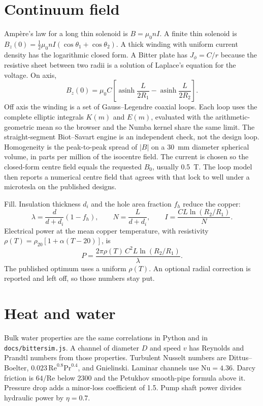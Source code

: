 \documentclass[11pt]{article}
\begin{document}
\section{Continuum field}

Amp\`ere's law for a long thin solenoid is $B=\mu_0 n I$.
A finite thin solenoid is $B_z(0)=\frac12\mu_0 n I(\cos\theta_1+\cos\theta_2)$.
A thick winding with uniform current density has the logarithmic closed form.
A Bitter plate has $J_\phi = C/r$ because the resistive sheet between two radii is a solution of Laplace's equation for the voltage.
On axis,
\begin{equation}
B_z(0)=\mu_0 C\left[\operatorname{asinh}\frac{L}{2R_1}-\operatorname{asinh}\frac{L}{2R_2}\right].
\end{equation}
Off axis the winding is a set of Gauss--Legendre coaxial loops.
Each loop uses the complete elliptic integrals $K(m)$ and $E(m)$, evaluated with the arithmetic-geometric mean so the browser and the Numba kernel share the same limit.
The straight-segment Biot--Savart engine is an independent check, not the design loop.
Homogeneity is the peak-to-peak spread of $|B|$ on a 30~mm diameter spherical volume, in parts per million of the isocentre field.
The current is chosen so the closed-form centre field equals the requested $B_0$, usually 0.5~T.
The loop model then reports a numerical centre field that agrees with that lock to well under a microtesla on the published designs.

Fill. Insulation thickness $d_i$ and the hole area fraction $f_h$ reduce the copper:
\begin{equation}
\lambda = \frac{d}{d+d_i}(1-f_h),\qquad
N = \frac{L}{d+d_i},\qquad
I = \frac{C L \ln(R_2/R_1)}{N}.
\end{equation}
Electrical power at the mean copper temperature, with resistivity $\rho(T)=\rho_{20}[1+\alpha(T-20)]$, is
\begin{equation}
P = \frac{2\pi \rho(T)\, C^2 L \ln(R_2/R_1)}{\lambda}.
\end{equation}
The published optimum uses a uniform $\rho(T)$.
An optional radial correction is reported and left off, so those numbers stay put.

\section{Heat and water}

Bulk water properties are the same correlations in Python and in \texttt{docs/bittersim.js}.
A channel of diameter $D$ and speed $v$ has Reynolds and Prandtl numbers from those properties.
Turbulent Nusselt numbers are Dittus--Boelter, $0.023\,\mathrm{Re}^{0.8}\mathrm{Pr}^{0.4}$, and Gnielinski.
Laminar channels use $\mathrm{Nu}=4.36$.
Darcy friction is $64/\mathrm{Re}$ below 2300 and the Petukhov smooth-pipe formula above it.
Pressure drop adds a minor-loss coefficient of 1.5.
Pump shaft power divides hydraulic power by $\eta=0.7$.
\end{document}
